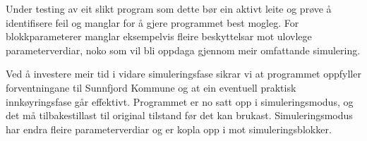 Under testing av eit slikt program som dette bør ein aktivt leite og prøve å identifisere feil og manglar for å gjere programmet best mogleg.
For blokkparameterer manglar eksempelvis fleire beskyttelsar mot ulovlege parameterverdiar, noko som vil bli oppdaga gjennom meir omfattande simulering.

Ved å investere meir tid i vidare simuleringsfase sikrar vi at programmet oppfyller forventningane til \gls{Sunnfjord Kommune} og at ein eventuell
praktisk innkøyringsfase går effektivt. \newline
Programmet er no satt opp i simuleringsmodus, og det må tilbakestillast til original tilstand før det kan brukast. 
Simuleringsmodus har endra fleire parameterverdiar og er kopla opp i mot simuleringsblokker.  



\newpage
